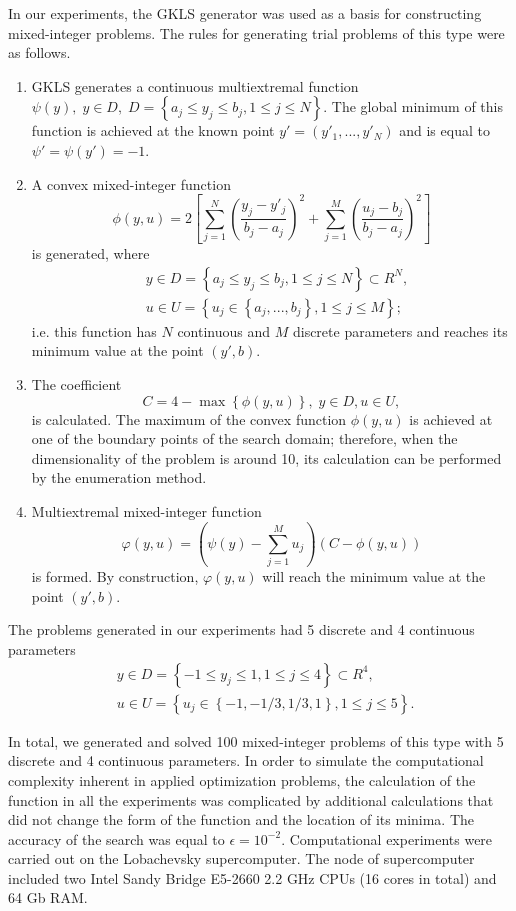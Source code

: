 \documentclass[
11pt,%
tightenlines,%
twoside,%
onecolumn,%
nofloats,%
nobibnotes,%
nofootinbib,%
superscriptaddress,%
noshowpacs,%
centertags]%
{revtex4}
\begin{document}
In our experiments, the GKLS generator was used as a basis for constructing mixed-integer problems. The rules for generating trial problems of this type were as follows.

\begin{enumerate}
    \item GKLS generates a continuous multiextremal function $\psi(y), \; y\in D, \; D = \left\{ a_j\leq y_j\leq b_j, 1\leq j \leq N \right\}$. The global minimum of this function is achieved at the known point $y'=(y'_1,...,y'_N)$ and is equal to $\psi'=\psi(y')=-1$.
    \item A convex mixed-integer function
    \[
            \phi (y,u) = 2 \left[ \sum_{j=1}^N \left( \frac{y_j - y'_j}{b_j-a_j} \right)^2 + \sum_{j=1}^M \left( \frac{u_j - b_j}{b_j-a_j} \right)^2 \right]
    \]
    is generated, where
    \begin{eqnarray*}
    & y\in D = \left\{ a_j\leq y_j\leq b_j, 1\leq j \leq N \right\} \subset R^N, \\
    & u\in U = \left\{ u_j \in  \left\{a_j, ..., b_j \right\}, 1\leq j \leq M \right\};
    \end{eqnarray*}
    i.e. this function has $N$ continuous and $M$ discrete parameters and reaches its minimum value at the point $(y',b)$.
    \item The coefficient
    \[
    C = 4 - \max \left\{ \phi(y,u) \right\}, \; y\in D, u \in U,
    \]
    is calculated. The maximum of the convex function $\phi(y,u)$ is achieved at one of the boundary points of the search domain; therefore, when the dimensionality of the problem is around 10, its calculation can be performed by the enumeration method.
    \item  Multiextremal mixed-integer function
    \[
    \varphi(y,u) = \left(\psi(y) - \sum_{j=1}^M{u_j}\right)\left(C - \phi(y,u)\right)
    \]
    is formed. By construction, $\varphi(y,u)$ will reach the minimum value at the point $(y',b)$.

\end{enumerate}


The problems generated in our experiments had 5 discrete and 4 continuous parameters
    \begin{eqnarray*}
    & y\in D = \left\{ -1 \leq y_j\leq 1, 1\leq j \leq 4 \right\} \subset R^4, \\
    & u\in U = \left\{ u_j \in  \left\{-1, -1/3, 1/3, 1 \right\}, 1\leq j \leq 5 \right\}.
    \end{eqnarray*}


In total, we generated and solved 100 mixed-integer problems of this type with 5 discrete and 4 continuous parameters. In order to simulate the computational complexity inherent in applied optimization problems, the calculation of the function in all the experiments was complicated by additional calculations that did not change the form of the function and the location of its minima.
The accuracy of the search was equal to $\epsilon = 10^{-2}$. Computational experiments were carried out on the Lobachevsky supercomputer. The node of supercomputer included two Intel Sandy Bridge E5-2660 2.2 GHz CPUs (16 cores in total) and 64 Gb RAM.
\end{document}
